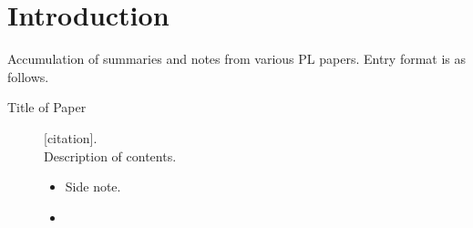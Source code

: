 \chapter {Introduction}

Accumulation of summaries and notes from various PL papers. Entry format is as follows.

\begin{description}
  \item[Title of Paper] {[citation].
    \\ Description of contents.
    \begin{itemize}
      \item Side note.
      \item {}
    \end{itemize}}
\end{description}
